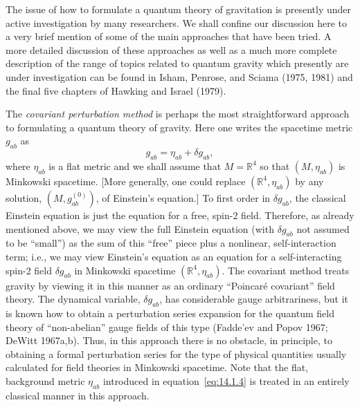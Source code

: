 The issue of how to formulate a quantum theory of gravitation is presently under
active investigation by many researchers. We shall confine our discussion here to a
very brief mention of some of the main approaches that have been tried. A more
detailed discussion of these approaches as well as a much more complete description
of the range of topics related to quantum gravity which presently are under investigation
can be found in Isham, Penrose, and Sciama (1975, 1981) and the final
five chapters of Hawking and Israel (1979).

The \emph{covariant perturbation method} is perhaps the most straightforward approach
to formulating a quantum theory of gravity. Here one writes the spacetime metric \(g_{ab}\)
as
\begin{equation}
  g_{ab}=\eta_{ab}+\delta g_{ab},
  \tag{14.1.4}\label{eq:14.1.4}
\end{equation}
where \(\eta_{ab}\) is a flat metric and we shall assume that \(M=\mathbb R^4\) so that
\((M,\eta_{ab})\) is Minkowski spacetime. [More generally, one could replace
\((\mathbb R^4,\eta_{ab})\) by any solution, \((M,g^{(0)}_{ab})\), of Einstein's equation.]
To first order in \(\delta g_{ab}\), the classical Einstein equation is just the equation for a
free, spin-2 field. Therefore, as already mentioned above, we may view the full Einstein
equation (with \(\delta g_{ab}\) not assumed to be ``small'') as the sum of this ``free'' piece
plus a nonlinear, self-interaction term; i.e., we may view Einstein's equation as an equation
for a self-interacting spin-2 field \(\delta g_{ab}\) in Minkowski spacetime
\((\mathbb R^4,\eta_{ab})\). The covariant method treats gravity by viewing it in this manner
as an ordinary ``Poincaré covariant'' field theory. The dynamical variable,
\(\delta g_{ab}\), has considerable gauge arbitrariness, but it is known how to obtain a
perturbation series expansion for the quantum field theory of ``non-abelian'' gauge fields
of this type (Fadde'ev and Popov 1967; DeWitt 1967a,b). Thus, in this approach there is
no obstacle, in principle, to obtaining a formal perturbation series for the type of
physical quantities usually calculated for field theories in Minkowski spacetime. Note
that the flat, background metric \(\eta_{ab}\) introduced in equation~\eqref{eq:14.1.4} is
treated in an entirely classical manner in this approach.

